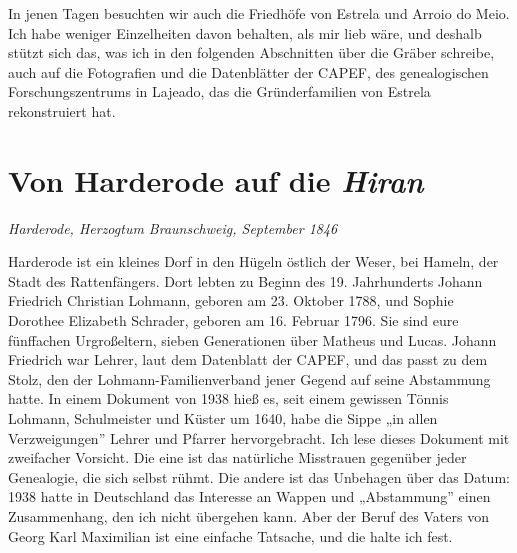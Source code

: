 \documentclass[
  ngerman,
  11pt,
  openany]{book}
\begin{document}
In jenen Tagen besuchten wir auch die Friedhöfe von Estrela und Arroio
do Meio. Ich habe weniger Einzelheiten davon behalten, als mir lieb
wäre, und deshalb stützt sich das, was ich in den folgenden Abschnitten
über die Gräber schreibe, auch auf die Fotografien und die Datenblätter
der CAPEF, des genealogischen Forschungszentrums in Lajeado, das die
Gründerfamilien von Estrela rekonstruiert hat.

\section{\texorpdfstring{Von Harderode auf die
\emph{Hiran}}{Von Harderode auf die Hiran}}\label{von-harderode-auf-die-hiran}

\emph{Harderode, Herzogtum Braunschweig, September 1846}

Harderode ist ein kleines Dorf in den Hügeln östlich der Weser, bei
Hameln, der Stadt des Rattenfängers. Dort lebten zu Beginn des 19.
Jahrhunderts Johann Friedrich Christian Lohmann, geboren am 23. Oktober
1788, und Sophie Dorothee Elizabeth Schrader, geboren am 16. Februar
1796. Sie sind eure fünffachen Urgroßeltern, sieben Generationen über
Matheus und Lucas. Johann Friedrich war Lehrer, laut dem Datenblatt der
CAPEF, und das passt zu dem Stolz, den der Lohmann-Familienverband jener
Gegend auf seine Abstammung hatte. In einem Dokument von 1938 hieß es,
seit einem gewissen Tönnis Lohmann, Schulmeister und Küster um 1640,
habe die Sippe „in allen Verzweigungen'' Lehrer und Pfarrer
hervorgebracht. Ich lese dieses Dokument mit zweifacher Vorsicht. Die
eine ist das natürliche Misstrauen gegenüber jeder Genealogie, die sich
selbst rühmt. Die andere ist das Unbehagen über das Datum: 1938 hatte in
Deutschland das Interesse an Wappen und „Abstammung'' einen
Zusammenhang, den ich nicht übergehen kann. Aber der Beruf des Vaters
von Georg Karl Maximilian ist eine einfache Tatsache, und die halte ich
fest.
\end{document}
